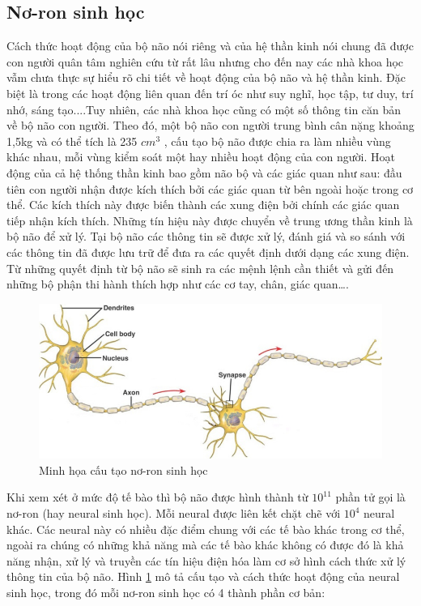 \subsection{Nơ-ron sinh học}
Cách thức hoạt động của bộ não nói riêng và của hệ thần kinh nói chung đã được con người quân tâm nghiên cứu từ rất lâu nhưng cho đến nay các nhà khoa học vẫm chưa thực sự hiểu rõ chi tiết về hoạt động của bộ não và hệ thần kinh. Đặc biệt là trong các hoạt động liên quan đến trí óc như suy nghĩ, học tập, tư duy, trí nhớ, sáng tạo....Tuy nhiên, các nhà khoa học cũng có một số thông tin căn bản về bộ não con người. Theo đó, một bộ não con người trung bình cân nặng khoảng 1,5kg và có thể tích là 235 $cm^{3}$ , cấu tạo bộ não được chia ra làm nhiều vùng khác nhau, mỗi vùng kiểm soát một hay nhiều hoạt động của con người. Hoạt động của cả hệ thống thần kinh bao gồm não bộ và các giác quan như sau: đầu tiên con người nhận được kích thích bởi các giác quan từ bên ngoài hoặc trong cơ thể. Các kích thích này được biến thành các xung điện bởi chính các giác quan tiếp nhận kích thích. Những tín hiệu này được chuyển về trung ương thần kinh là bộ não để xử lý. Tại bộ não các thông tin sẽ được xử lý, đánh giá và so sánh với các thông tin đã được lưu trữ để đưa ra các quyết định dưới dạng các xung điện. Từ những quyết định từ bộ não sẽ sinh ra các mệnh lệnh cần thiết và gửi đến những bộ phận thi hành thích hợp như các cơ tay, chân, giác quan….
\begin{center}
\begin{figure}[H]
\begin{center}
\includegraphics[scale=0.7]{chap3/image/neoronsinhhoc.jpg}
\caption{Minh họa cấu tạo nơ-ron sinh học}
\label{fig:noronsinhhoc}
\end{center}
\end{figure}
\end{center}
Khi xem xét ở mức độ tế bào thì bộ não được hình thành từ $10^11$ phần tử gọi là nơ-ron (hay neural sinh học). Mỗi neural được liên kết chặt chẽ với $10^{4}$ neural khác. Các neural này có nhiều đặc điểm chung với các tế bào khác trong cơ thể, ngoài ra chúng có những khả năng mà các tế bào khác không có được đó là khả năng nhận, xử lý và truyền các tín hiệu điện hóa làm cơ sở hình cách thức xử lý thông tin của bộ não. Hình \ref{fig:noronsinhhoc} mô tả cấu tạo và cách thức hoạt động của neural sinh học, trong đó mỗi nơ-ron sinh học có 4 thành phần cơ bản: 
